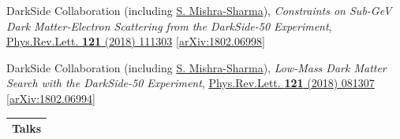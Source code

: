 \documentclass[letterpaper,11pt]{article}
\makeatletter
\newenvironment{packed_enumerate}[1][]{
\begin{etaremune}[#1]
  \setlength{\itemsep}{4.0pt}
  \setlength{\parskip}{0pt}
  \setlength{\parsep}{0pt}}{\end{etaremune}
}
\newcommand{\cvsection}[2]{%
  \needspace{4\baselineskip}%
  \par\vspace{3mm}%
  \noindent
  \begin{tabular*}{\textwidth}{l@{\extracolsep{\fill}}}
  \large {\sc \Large{#2}}\\
  \hline
  \end{tabular*}\vspace{3mm}%
}
\makeatother
\begin{document}
\begin{packed_enumerate}[start=9]
  \item DarkSide Collaboration (including \underline{S. Mishra-Sharma}), \emph{Constraints on Sub-GeV Dark Matter-Electron Scattering from the DarkSide-50 Experiment}, \href{https://journals.aps.org/prl/abstract/10.1103/PhysRevLett.121.111303}{Phys.Rev.Lett. \textbf{121} (2018) 111303} \href{https://arxiv.org/abs/1802.06998}{[arXiv:1802.06998]}

  \item DarkSide Collaboration (including \underline{S. Mishra-Sharma}), \emph{Low-Mass Dark Matter Search with the DarkSide-50 Experiment}, \href{https://journals.aps.org/prl/abstract/10.1103/PhysRevLett.121.081307}{Phys.Rev.Lett. \textbf{121} (2018) 081307} \href{https://arxiv.org/abs/1802.06994}{[arXiv:1802.06994]}
\end{packed_enumerate}


\cvsection{\faBullhorn}{Talks}
\end{document}
